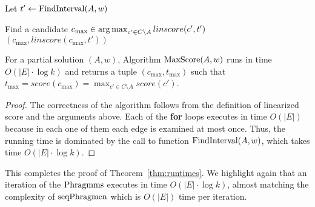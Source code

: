 \begin{algorithm}[htb]\label{alg:maxscore}
\SetAlgoLined
{}
Let $t'\leftarrow \operatorname{FindInterval}(A,w)$\;

Find a candidate $c_{\max}\in\operatorname*{arg\,max}_{c'\in C\setminus A} linscore(c',t')$\;
\Return $(c_{\max}, linscore(c_{\max},t'))$\;
 \caption{$\maxscore(A,w)$}
\end{algorithm}

\begin{lemma}\label{lem:maxscore}
For a partial solution $(A,w)$, Algorithm $\maxscore(A,w)$ runs in time $O(|E|\cdot \log k)$ and returns a tuple $(c_{\max}, t_{\max})$ such that $t_{\max}=score(c_{\max})=\max_{c'\in C\setminus A} score(c')$.
\end{lemma}
\begin{proof}
The correctness of the algorithm follows from the definition of linearized score and the arguments above. Each of the \textbf{for} loops executes in time $O(|E|)$ because in each one of them each edge is examined at most once. Thus, the running time is dominated by the call to function $\operatorname{FindInterval}(A,w)$, which takes time $O(|E|\cdot \log k)$.
\end{proof}

This completes the proof of Theorem~\ref{thm:runtimes}. 
We highlight again that an iteration of the $\operatorname{Phragmms}$ executes in time $O(|E|\cdot \log k)$, almost matching the complexity of $\operatorname{seqPhragmen}$ which is $O(|E|)$ time per iteration.

